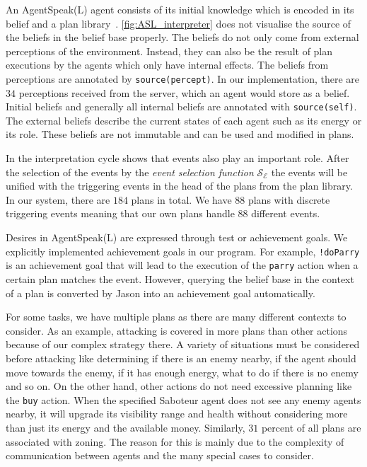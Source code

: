 An AgentSpeak(L) agent consists of its initial knowledge which is encoded in its belief and a plan library~\cite{rafael_BDIAgent_2005}.
\autoref{fig:ASL_interpreter} does not visualise the source of the beliefs in the belief base properly.
The beliefs do not only come from external perceptions of the environment. %
Instead, they can also be the result of plan executions by the agents which only have internal effects.
The beliefs from perceptions are annotated by \texttt{source(percept)}.
In our implementation, there are $34$ perceptions received from the server, which an agent would store as a belief.
Initial beliefs and generally all internal beliefs are annotated with \texttt{source(self)}.
The external beliefs describe the current states of each agent such as its energy or its role.
These beliefs are not immutable and can be used and modified in plans.

In the interpretation cycle shows that events also play an important role.
After the selection of the events by the \emph{event selection function} $\mathcal{S_E}$ the events will be unified with the triggering events in the head of the plans from the plan library.
In our system, there are $184$ plans in total.
We have $88$ plans with discrete triggering events meaning that our own plans handle $88$ different events.

Desires in AgentSpeak(L) are expressed through test or achievement goals.
We explicitly implemented achievement goals in our program.
For example, \texttt{!doParry} is an achievement goal that will lead to the execution of the \texttt{parry} action when a certain plan matches the event.
However, querying the belief base in the context of a plan is converted by Jason into an achievement goal automatically.

For some tasks, we have multiple plans as there are many different contexts to consider.
As an example, attacking is covered in more plans than other actions because of our complex strategy there.
A variety of situations must be considered before attacking like determining if there is an enemy nearby, if the agent should move towards the enemy, if it has enough energy, what to do if there is no enemy and so on.
On the other hand, other actions do not need excessive planning like the \texttt{buy} action.
When the specified Saboteur agent does not see any enemy agents nearby, it will upgrade its visibility range and health without considering more than just its energy and the available money.
Similarly, $31$ percent of all plans are associated with zoning.
The reason for this is mainly due to the complexity of communication between agents and the many special cases to consider.

